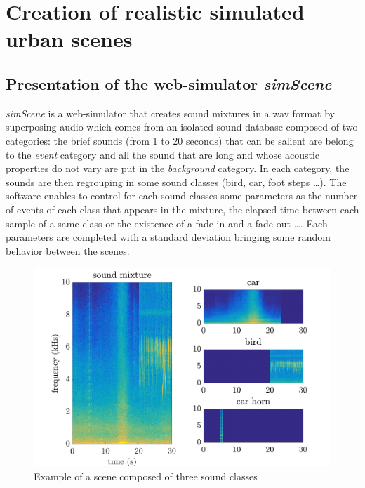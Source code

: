 \documentclass[a4,11pt,twocolumn]{article}
\begin{document}
\section{Creation of realistic simulated urban scenes}
\subsection{Presentation of the web-simulator \textit{simScene}}
\textit{simScene} \cite{rossignol_simscene:_2015} is a web-simulator that creates sound mixtures in a wav format by superposing audio which comes from an isolated sound database composed of two categories: the brief sounds (from 1 to 20 seconds)
that can be salient are belong to the \textit{event} category and all the sound that are long and whose acoustic properties do not vary are put in the \textit{background} category. In each category, the sounds are then regrouping in some sound classes (bird, car, foot steps \dots). The software enables to control for each sound classes some parameters as the number of events of each class that appears in the mixture, the elapsed time between each sample of a same class or the existence of a fade in and a fade out \dots. Each parameters are completed with a standard deviation bringing some random behavior between the scenes. \\


\begin{figure}[h]
\centering
\includegraphics[width = \linewidth]{./pictures/spectrogramme_abstract_sceneSimpleKlaxonFixe_EN.pdf}
\caption{Example of a scene composed of three sound classes}
\label{fig:exampleSimScene}
\end{figure}
\end{document}
